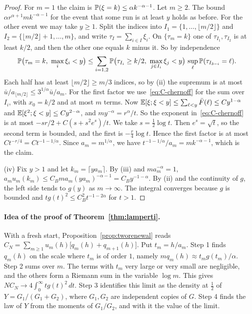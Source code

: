 \begin{proof}
For $m=1$ the claim is $\mathbb{P}(\xi=k)\le\alpha k^{-\alpha-1}$. Let $m\ge2$. The bound
$\alpha r^{\alpha+1}mk^{-\alpha-1}$ for the event that some run is at least $y$ holds as
before. For the other event we may take $y\ge1$. Split the indices into
$I_1=\{1,\dots,\lfloor m/2\rfloor\}$ and $I_2=\{\lfloor m/2\rfloor+1,\dots,m\}$, and
write $\tau_I=\sum_{i\in I}\xi_i$. On $\{\tau_m=k\}$ one of $\tau_{I_1},\tau_{I_2}$ is at
least $k/2$, and then the other one equals $k$ minus it. So by independence
\[
\Prob\bigl(\tau_m=k,\ \max_i\xi_i<y\bigr)\le\sum_{i=1,2}
\Prob\bigl(\tau_{I_i}\ge k/2,\ \max_{j\in I_i}\xi_j<y\bigr)\,\sup_\ell\Prob(\tau_{I_{3-i}}=\ell).
\]
Each half has at least $\lfloor m/2\rfloor\ge m/3$ indices, so by (ii) the supremum is at
most $\bar u/a_{\lfloor m/2\rfloor}\le3^{1/\alpha}\bar u/a_m$. For the first factor we
use~\eqref{eq:C-chernoff} for the sum over $I_i$, with $x_0=k/2$ and at most $m$ terms.
Now $\mathbb{E}[\xi;\xi<y]\le\sum_{\ell<y}\bar F(\ell)\le Cy^{1-\alpha}$ and
$\mathbb{E}[\xi^2;\xi<y]\le Cy^{2-\alpha}$, and $my^{-\alpha}=r^\alpha/t$. So the exponent
in~\eqref{eq:C-chernoff} is at most $-sr/2+C(s+s^2e^s)/t$. We take $s=\frac12\log t$.
Then $e^s=\sqrt t$, so the second term is bounded, and the first is $-\frac r4\log t$.
Hence the first factor is at most $Ct^{-r/4}=Ct^{-1-1/\alpha}$. Since $a_m=m^{1/\alpha}$,
we have $t^{-1-1/\alpha}/a_m=mk^{-\alpha-1}$, which is the claim.

(iv) Fix $y>1$ and let $k_m=\lceil ya_m\rceil$. By (iii) and $ma_m^{-\alpha}=1$,
$a_mu_m(k_m)\le C_Bma_m(ya_m)^{-\alpha-1}=C_By^{-1-\alpha}$. By (ii) and the continuity
of $g$, the left side tends to $g(y)$ as $m\to\infty$. The integral converges because
$g$ is bounded and $tg(t)^2\le C_B^2t^{-1-2\alpha}$ for $t>1$.
\end{proof}

\paragraph{Idea of the proof of Theorem~\ref{thm:lamperti}.}
With a fresh start, Proposition~\ref{prop:tworenewal} reads
$C_N=\sum_{m\ge1}u_m(h)\bigl[q_m(h)+q_{m+1}(h)\bigr]$. Put $t_m=h/a_m$. Step 1 finds
$q_m(h)$ on the scale where $t_m$ is of order $1$, namely $mq_m(h)\approx t_mg(t_m)/\alpha$.
Step 2 sums over $m$. The terms with $t_m$ very large or very small are negligible, and
the others form a Riemann sum in the variable $\log m$. This gives
$NC_N\to4\int_0^\infty tg(t)^2\,dt$. Step 3 identifies this limit as the density at
$\frac12$ of $Y=G_1/(G_1+G_2)$, where $G_1,G_2$ are independent copies of $G$. Step 4
finds the law of $Y$ from the moments of $G_1/G_2$, and with it the value of the limit.

